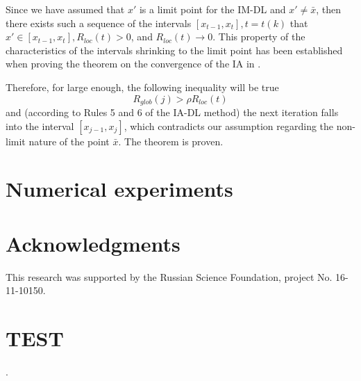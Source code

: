 \documentclass[review]{elsarticle}
\begin{document}
	Since we have assumed that $x'$ is a limit point for the IM-DL and  $x' \neq \bar x$, then there exists such a sequence of the intervals $[x_{t-1}, x_t], t=t(k)$ that $x' \in [x_{t-1}, x_t], R_{loc}(t)>0$, and $R_{loc}(t) \rightarrow 0$. This property of the characteristics of the intervals shrinking to the limit point has been established when proving the theorem on the convergence of the IA in \cite{Sergeyev2013}.

	Therefore, for large enough, the following inequality will be true
\begin{equation}
	R_{glob}(j) > \rho R_{loc}(t)
\end{equation}
and (according to Rules 5 and 6 of the IA-DL method) the next iteration falls into the interval $[x_{j-1}, x_j]$, which contradicts our assumption regarding the non-limit nature of the point $\bar x$. The theorem is proven.



\section{Numerical experiments}

\section*{Acknowledgments}
This research was supported by the Russian Science Foundation, project No. 16-11-10150.

\section{TEST}

\cite{Evtushenko1971, Piyavskii1972, Shubert1972, Strongin1970, Evtushenko2009, Evtushenko2013, Strongin2000, Sergeyev2013, Pinter1996, Jones2009, Wood1991, Meewella1988, Mladineo1986, Vaz2009, Stripinis2019, Paulavicius2016, Pillo2012, Pillo2016, Barkalov2017_1, Barkalov2017_2, Sergeyev2006, Zilinskas2008, Sovrasov2019, Kvasov2003, Sergeyev2010,Sergeyev2016, Horst1996, Gablonsky2001, Jones1993, Gaviano2003, Barkalov2018, Paulavicius2014, Sergeyev2015, Strongin2018, Gergel2017_2, Gergel2019}.



\end{document}
